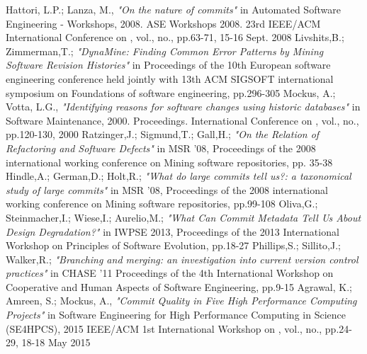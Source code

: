 %
%
%
\begin{thebibliography}{1}
\bibitem{}
Hattori, L.P.; Lanza, M., \emph{"On the nature of commits"} in Automated Software Engineering - Workshops, 2008. ASE Workshops 2008. 23rd IEEE/ACM International Conference on , vol., no., pp.63-71, 15-16 Sept. 2008
\bibitem{}
Livshits,B.; Zimmerman,T.; \emph{"DynaMine: Finding Common Error Patterns by Mining Software Revision Histories"} in Proceedings of the 10th European software engineering conference held jointly with 13th ACM SIGSOFT international symposium on Foundations of software engineering, pp.296-305
\bibitem{}
Mockus, A.; Votta, L.G., \emph{"Identifying reasons for software changes using historic databases"} in Software Maintenance, 2000. Proceedings. International Conference on , vol., no., pp.120-130, 2000
\bibitem{}
Ratzinger,J.; Sigmund,T.; Gall,H.; \emph{"On the Relation of Refactoring and Software Defects"} in MSR '08, Proceedings of the 2008 international working conference on Mining software repositories, pp. 35-38
\bibitem{}
Hindle,A.; German,D.; Holt,R.; \emph{"What do large commits tell us?: a taxonomical study of large commits"} in MSR '08, Proceedings of the 2008 international working conference on Mining software repositories, pp.99-108
\bibitem{}
Oliva,G.; Steinmacher,I.; Wiese,I.; Aurelio,M.; \emph{"What Can Commit Metadata Tell Us About Design Degradation?"} in IWPSE 2013, Proceedings of the 2013 International Workshop on Principles of Software Evolution, pp.18-27
\bibitem{}
Phillips,S.; Sillito,J.; Walker,R.; \emph{"Branching and merging: an investigation into current version control practices"} in CHASE '11 Proceedings of the 4th International Workshop on Cooperative and Human Aspects of Software Engineering, pp.9-15
\bibitem{}
Agrawal, K.; Amreen, S.; Mockus, A., \emph{"Commit Quality in Five High Performance Computing Projects"} in Software Engineering for High Performance Computing in Science (SE4HPCS), 2015 IEEE/ACM 1st International Workshop on , vol., no., pp.24-29, 18-18 May 2015

\end{thebibliography}
